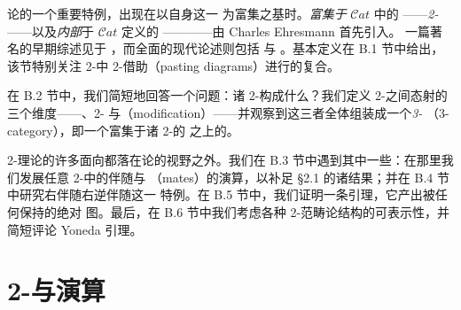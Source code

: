 
\providecommand{\Cat}{\mathcal{C}at}
\providecommand{\qcOne}{\mathbf{1}}  %
\providecommand{\hTwoCell}[5]{\tikz[baseline=-0.8ex]{%
  \node (rvl) at (0,0) {$#1$};
  \node (rvr) at (2.9,0) {$#2$};
  \draw[->] (rvl) to[bend left=28] node[above]{$\scriptstyle #3$} (rvr);
  \draw[->] (rvl) to[bend right=28] node[below]{$\scriptstyle #5$} (rvr);
  \node at (1.45,0) {$\scriptstyle #4$};}}
\providecommand{\rvIntCat}[3]{\begin{tikzpicture}[x=1.9em,y=1.4em]%
  \node (rva) at (0,1.1) {$#1$};
  \node (rvb) at (4.8,1.1) {$#2$};
  \node (rvc) at (8.8,1.1) {$#3$};
  \draw[->] (rva) -- node[above]{$\scriptstyle\circ$} (rvb);
  \draw[->] ([yshift=0.42em]rvb) -- node[above]{$\scriptstyle d$} ([yshift=0.42em]rvc);
  \draw[->] (rvc) -- node[below]{$\scriptstyle i$} (rvb);
  \draw[->] ([yshift=-0.62em]rvb) -- node[below]{$\scriptstyle c$} ([yshift=-0.62em]rvc);
\end{tikzpicture}}

\trEnrichedCategory{}论的一个重要特例，出现在以\trCategory{}自身这一%
\trCartesianClosed{}\trCategory{}为富集之基时。\emph{富集于} $\Cat$ 中的%
\trCategory{}——\emph{2-\trCategory}——以及\emph{内部}于 $\Cat$ 定义的%
\trCategory{}——\emph{\trDoubleCategory}——由 Charles Ehresmann 首先引入。
一篇著名的早期综述见于 \cite{bib70}，而全面的现代论述则包括 \cite{bib73} 与%
\cite{bib59}。基本定义在 B.1 节中给出，该节特别关注 2-\trCategory{}中%
2-\trCell{}借助\emph{\trPastingDiagram}（pasting diagrams）进行的复合。

在 B.2 节中，我们简短地回答一个问题：诸 2-\trCategory{}构成什么？我们定义
2-\trCategory{}之间态射的三个维度——\trTwoFunctor、2-\trNaturalTransformation{}%
与\trModification{}（modification）——并观察到这三者全体组装成一个\emph{3-\trCategory}
（3-category），即一个富集于诸 2-\trCategory{}的\trCartesianClosed{}\trCategory{}%
之上的\trCategory。

2-\trCategory{}理论的许多面向都落在\trEnrichedCategory{}论的视野之外。我们在
B.3 节中遇到其中一些：在那里我们发展任意 2-\trCategory{}中的伴随与\trMate{}%
（mates）的演算，以补足 §2.1 的诸结果；并在 B.4 节中研究右伴随右逆伴随这一
特例。在 B.5 节中，我们证明一条引理，它产出被任何\trTwoFunctor{}保持的绝对%
\trLifting{}图。最后，在 B.6 节中我们考虑各种 2-范畴论结构的可表示性，并
简短评论\trBicategorical{} Yoneda 引理。

\section{2-\trCategory{}与\trPastingDiagram{}演算}\label{sec:two-categories-and-the-calculus-of-pasting-diagrams}

